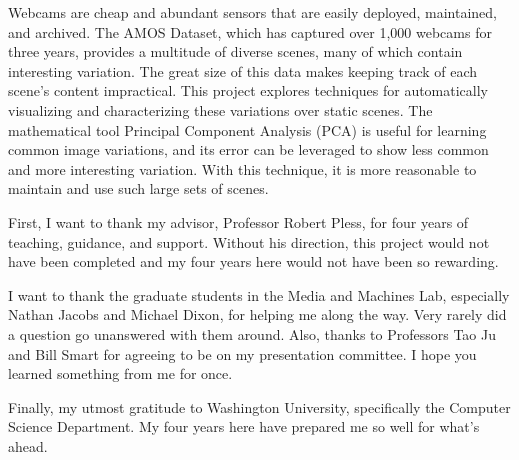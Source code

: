 %

\begin{thesistitlepage}               %
\end{thesistitlepage}

\begin{thesisabstract}
Webcams are cheap and abundant sensors that are easily deployed, maintained, and archived.  The AMOS Dataset, which has captured over 1,000 webcams for three years, provides a multitude of diverse scenes, many of which contain interesting variation.  The great size of this data makes keeping track of each scene's content impractical.  This project explores techniques for automatically visualizing and characterizing these variations over static scenes.  The mathematical tool Principal Component Analysis (PCA) is useful for learning common image variations, and its error can be leveraged to show less common and more interesting variation.  With this technique, it is more reasonable to maintain and use such large sets of scenes.
\end{thesisabstract}

\begin{thesisacknowledgments}

First, I want to thank my advisor, Professor Robert Pless, for four years of teaching, guidance, and support.  Without his direction, this project would not have been completed and my four years here would not have been so rewarding.

I want to thank the graduate students in the Media and Machines Lab, especially Nathan Jacobs and Michael Dixon, for helping me along the way.  Very rarely did a question go unanswered with them around.  Also, thanks to Professors Tao Ju and Bill Smart for agreeing to be on my presentation committee.  I hope you learned something from me for once.

Finally, my utmost gratitude to Washington University, specifically the Computer Science Department.  My four years here have prepared me so well for what's ahead.

\end{thesisacknowledgments}


\begin{singlespace}
\tableofcontents



\listoffigures
\end{singlespace}

